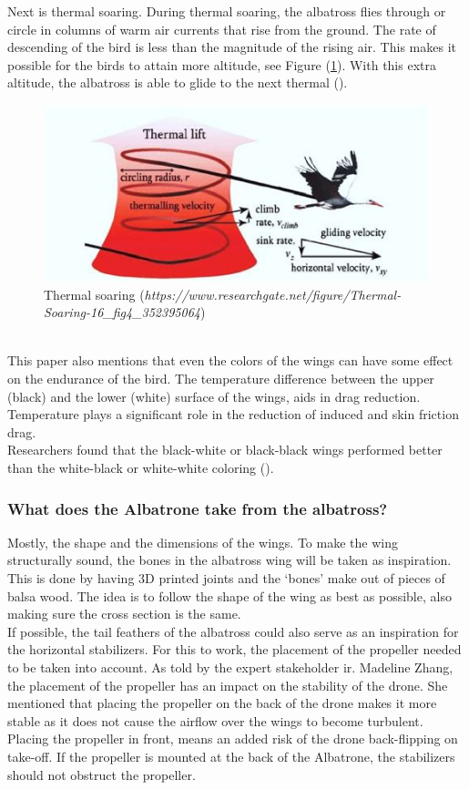 Next is thermal soaring. During thermal soaring, the albatross flies through or circle in columns of warm air currents that rise from the ground. The rate of descending of the bird is less than the magnitude of the rising air. This makes it possible for the birds to attain more altitude, see Figure (\ref{fig: thermal soaring}). With this extra altitude, the albatross is able to glide to the next thermal (\cite{Evolution_Alba}). 

\begin{figure}
    \centering
    \includegraphics[width=0.5\linewidth]{images/thermal soaring.jpeg}
    \caption{Thermal soaring (\textit{https://www.researchgate.net/figure/Thermal-Soaring-16_fig4_352395064})}
    \label{fig: thermal soaring}
\end{figure}\\

This paper also mentions that even the colors of the wings can have some effect on the endurance of the bird. The temperature difference between the upper (black) and the lower (white) surface of the wings, aids in drag reduction. Temperature plays a significant role in the reduction of induced and skin friction drag.\\

Researchers found that the black-white or black-black wings performed better than the white-black or white-white coloring (\cite{Evolution_Alba}).\\


\subsubsection{What does the Albatrone take from the albatross?} 

Mostly, the shape and the dimensions of the wings. To make the wing structurally sound, the bones in the albatross wing will be taken as inspiration. This is done by having 3D printed joints and the ‘bones’ make out of pieces of balsa wood. The idea is to follow the shape of the wing as best as possible, also making sure the cross section is the same. \\

If possible, the tail feathers of the albatross could also serve as an inspiration for the horizontal stabilizers. For this to work, the placement of the propeller needed to be taken into account.
As told by the expert stakeholder ir. Madeline Zhang, the placement of the propeller has an impact on the stability of the drone. She mentioned that placing the propeller on the back of the drone makes it more stable as it does not cause the airflow over the wings to become turbulent. Placing the propeller in front, means an added risk of the drone back-flipping on take-off. If the propeller is mounted at the back of the Albatrone, the stabilizers should not obstruct the propeller.
 

